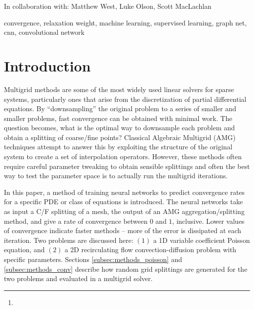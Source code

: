 \documentclass[review]{siamart190516}
\author{\TheName\thanks{\TheAddress}}
\title{{\TheTitle}}
\newcommand{\TheCollaborators}{%
  Matthew West,
  Luke Olson,
  Scott MacLachlan
}
\begin{document}
\maketitle

\begin{center}
In collaboration with:
  {\TheCollaborators}
\end{center}
\vspace{1cm}

\begin{abstract}
  
\end{abstract}

\begin{keywords}
  convergence, relaxation weight, machine learning, supervised learning, graph net, cnn, convolutional network
\end{keywords}

\section{Introduction}\label{sec:intro}

Multigrid methods are some of the most widely used linear solvers for sparse systems, particularly ones that arise from the discretization of partial differential equations.  By ``downsampling'' the original problem to a series of smaller and smaller problems, fast convergence can be obtained with minimal work.  The question becomes, what is the optimal way to downsample each problem and obtain a splitting of coarse/fine points?  Classical Algebraic Multigrid (AMG) techniques attempt to answer this by exploiting the structure of the original system to create a set of interpolation operators.  However, these methods often require careful parameter tweaking to obtain sensible splittings and often the best way to test the parameter space is to actually run the multigrid iterations.

In this paper, a method of training neural networks to predict convergence rates for a specific PDE or class of equations is introduced.  The neural networks take as input a C/F splitting of a mesh, the output of an AMG aggregation/splitting method, and give a rate of convergence between $0$ and $1$, inclusive.  Lower values of convergence indicate faster methods -- more of the error is dissipated at each iteration.  Two problems are discussed here: $(1)$ a 1D variable coefficient Poisson equation, and $(2)$ a 2D recirculating flow convection-diffusion problem with specific parameters.  Sections \ref{subsec:methods_poisson} and \ref{subsec:methods_conv} describe how random grid splittings are generated for the two problems and evaluated in a multigrid solver.
\end{document}
